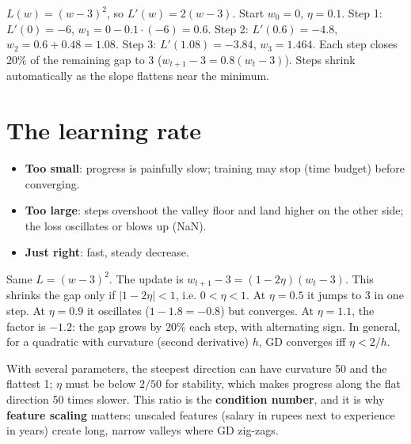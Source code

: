 \begin{example}
$L(w) = (w-3)^2$, so $L'(w) = 2(w-3)$. Start $w_0 = 0$, $\eta = 0.1$.
Step 1: $L'(0) = -6$, $w_1 = 0 - 0.1\cdot(-6) = 0.6$.
Step 2: $L'(0.6) = -4.8$, $w_2 = 0.6 + 0.48 = 1.08$.
Step 3: $L'(1.08) = -3.84$, $w_3 = 1.464$.
Each step closes 20\% of the remaining gap to 3 ($w_{t+1} - 3 = 0.8(w_t - 3)$). Steps shrink automatically as the slope
flattens near the minimum.
\end{example}

\section{The learning rate}
\begin{itemize}
\item \textbf{Too small}: progress is painfully slow; training may stop (time budget) before converging.
\item \textbf{Too large}: steps overshoot the valley floor and land higher on the other side; the loss oscillates or
  blows up (NaN).
\item \textbf{Just right}: fast, steady decrease.
\end{itemize}

\begin{example}
Same $L = (w-3)^2$. The update is $w_{t+1} - 3 = (1 - 2\eta)(w_t - 3)$. This shrinks the gap only if
$|1 - 2\eta| < 1$, i.e. $0 < \eta < 1$. At $\eta = 0.5$ it jumps to 3 in one step. At $\eta = 0.9$ it oscillates
($1 - 1.8 = -0.8$) but converges. At $\eta = 1.1$, the factor is $-1.2$: the gap grows by 20\% each step, with alternating
sign. In general, for a quadratic with curvature (second derivative) $h$, GD converges iff $\eta < 2/h$.
\end{example}

With several parameters, the steepest direction can have curvature 50 and the flattest 1; $\eta$ must be below $2/50$
for stability, which makes progress along the flat direction 50 times slower. This ratio is the \textbf{condition
number}, and it is why \textbf{feature scaling} matters: unscaled features (salary in rupees next to experience in years)
create long, narrow valleys where GD zig-zags.

